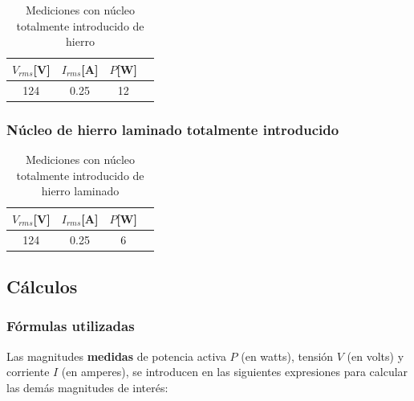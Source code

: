 \documentclass{article}
\begin{document}
            \begin{table}[H]
                \centering
                \begin{tabular}{|c|c|c|c|}
                    \hline
                    $V_{rms} $[V] & $I_{rms} $[A] & $P $[W] \\ \hline
                    124           & 0.25         & 12    \\ \hline
                \end{tabular}
                \caption{Mediciones con núcleo totalmente introducido de hierro}
                \label{tab:mediciones-nucleo-totalmente-introducido-hierro}
            \end{table}

            \subsubsection{Núcleo de hierro laminado totalmente introducido}

            \begin{table}[H]
                \centering
                \begin{tabular}{|c|c|c|c|}
                    \hline
                    $V_{rms} $[V] & $I_{rms} $[A] & $P $[W] \\ \hline
                    124           & 0.25         & 6    \\ \hline
                \end{tabular}
                \caption{Mediciones con núcleo totalmente introducido de hierro laminado}
                \label{tab:mediciones-nucleo-totalmente-introducido-hierro-laminado}
            \end{table}

        \subsection{Cálculos} \label{sec:Cálculos}

            \subsubsection*{Fórmulas utilizadas}

            Las magnitudes \textbf{medidas} de potencia activa $P$ (en watts), 
            tensión $V$ (en volts) y corriente $I$ (en amperes), se introducen en las siguientes
            expresiones para calcular las demás magnitudes de interés:
\end{document}
